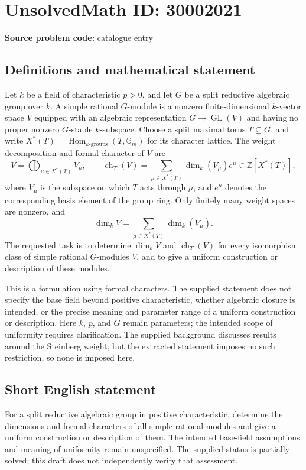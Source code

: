\documentclass[11pt]{article}
\newcommand{\Z}{\mathbb{Z}}
\begin{document}
\section*{UnsolvedMath ID: 30002021}
\textbf{Source problem code:} catalogue entry
\subsection{Definitions and mathematical statement}
Let \(k\) be a field of characteristic \(p>0\), and let \(G\) be a split reductive algebraic group over \(k\). A simple rational \(G\)-module is a nonzero finite-dimensional \(k\)-vector space \(V\) equipped with an algebraic representation \(G\to\operatorname{GL}(V)\) and having no proper nonzero \(G\)-stable \(k\)-subspace. Choose a split maximal torus \(T\subseteq G\), and write \(X^*(T)=\operatorname{Hom}_{k\text{-groups}}(T,\mathbb G_m)\) for its character lattice. The weight decomposition and formal character of \(V\) are
\[
V=\bigoplus_{\mu\in X^*(T)}V_\mu,
\qquad
\operatorname{ch}_T(V)=\sum_{\mu\in X^*(T)}\dim_k(V_\mu)e^\mu\in\Z[X^*(T)],
\]
where \(V_\mu\) is the subspace on which \(T\) acts through \(\mu\), and \(e^\mu\) denotes the corresponding basis element of the group ring. Only finitely many weight spaces are nonzero, and
\[
\dim_k V=\sum_{\mu\in X^*(T)}\dim_k(V_\mu).
\]
The requested task is to determine \(\dim_k V\) and \(\operatorname{ch}_T(V)\) for every isomorphism class of simple rational \(G\)-modules \(V\), and to give a uniform construction or description of these modules.

This is a formulation using formal characters. The supplied statement does not specify the base field beyond positive characteristic, whether algebraic closure is intended, or the precise meaning and parameter range of a uniform construction or description. Here \(k\), \(p\), and \(G\) remain parameters; the intended scope of uniformity requires clarification. The supplied background discusses results around the Steinberg weight, but the extracted statement imposes no such restriction, so none is imposed here.
\subsection{Short English statement}
For a split reductive algebraic group in positive characteristic, determine the dimensions and formal characters of all simple rational modules and give a uniform construction or description of them. The intended base-field assumptions and meaning of uniformity remain unspecified. The supplied status is partially solved; this draft does not independently verify that assessment.
\end{document}
